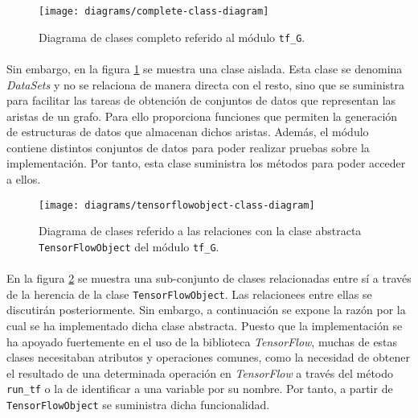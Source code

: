\documentclass{subfiles}
\begin{document}
          \begin{figure}[h!]
            \centering
            \texttt{[image: diagrams/complete-class-diagram]}
            \caption{Diagrama de clases completo referido al módulo \texttt{tf\_G}.}
            \label{img:class_diagram}
          \end{figure}

          \paragraph{}
          Sin embargo, en la figura \ref{img:class_diagram} se muestra una clase aislada. Esta clase se denomina \emph{DataSets} y no se relaciona de manera directa con el resto, sino que se suministra para facilitar las tareas de obtención de conjuntos de datos que representan las aristas de un grafo. Para ello proporciona funciones que permiten la generación de estructuras de datos que almacenan dichos aristas. Además, el módulo contiene distintos conjuntos de datos para poder realizar pruebas sobre la implementación. Por tanto, esta clase suministra los métodos para poder acceder a ellos.

          \begin{figure}[h!]
            \centering
            \texttt{[image: diagrams/tensorflowobject-class-diagram]}
            \caption{Diagrama de clases referido a las relaciones con la clase abstracta \texttt{TensorFlowObject} del módulo \texttt{tf\_G}.}
            \label{img:tensorflowobject_class_diagram}
          \end{figure}

          \paragraph{}
          En la figura \ref{img:tensorflowobject_class_diagram} se muestra una sub-conjunto de clases relacionadas entre sí a través de la herencia de la clase \texttt{TensorFlowObject}. Las relacionees entre ellas se discutirán posteriormente. Sin embargo, a continuación se expone la razón por la cual se ha implementado dicha clase abstracta. Puesto que la implementación se ha apoyado fuertemente en el uso de la biblioteca \emph{TensorFlow}, muchas de estas clases necesitaban atributos y operaciones comunes, como la necesidad de obtener el resultado de una determinada operación en \emph{TensorFlow} a través del método \texttt{run\_tf} o la de identificar a una variable por su nombre. Por tanto, a partir de \texttt{TensorFlowObject} se suministra dicha funcionalidad.
\end{document}
